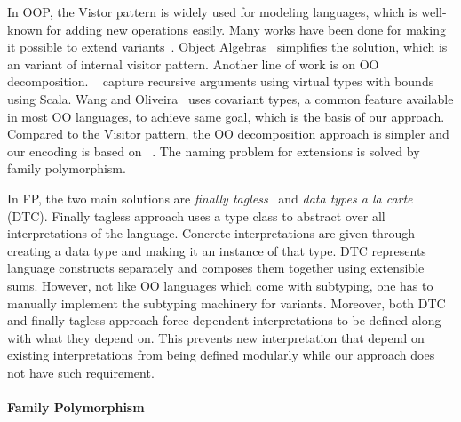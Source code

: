 In OOP, the Vistor pattern is widely used for modeling languages, which is
well-known for adding new operations easily. Many works
have been done for making it possible to extend variants~\cite{oliveira07genericity,oliveira09modular}.
Object Algebras~\cite{bruno12oa} simplifies the solution, which is an variant of
internal visitor pattern.
Another line of work is on OO decomposition. ~\cite{zenger} capture recursive
arguments using virtual types with bounds using Scala. Wang and Oliveira~\cite{eptrivially16}
uses covariant types, a common feature available in most OO languages, to
achieve same goal, which is the basis of our approach.
Compared to the Visitor pattern, the OO decomposition approach is simpler and
our encoding is based on ~\cite{eptrivially16}. The
naming problem for extensions is solved by family polymorphism.

In FP, the two main solutions are \emph{finally
  tagless}~\cite{carette2009finally} and \emph{data types a la
  carte}~\cite{swierstra2008data} (DTC).
Finally tagless approach uses a type class to abstract over all interpretations
of the language. Concrete interpretations are given through creating a data type and
making it an instance of that type.
DTC represents language constructs separately and composes them together using
extensible sums. However, not like OO languages which come with subtyping, one
has to manually implement the subtyping machinery for variants.
Moreover, both DTC and finally tagless approach force dependent interpretations
to be defined along with what they depend on.
This prevents new interpretation that depend on existing interpretations from
being defined modularly while our approach does not have such requirement.

\paragraph{Family Polymorphism}

